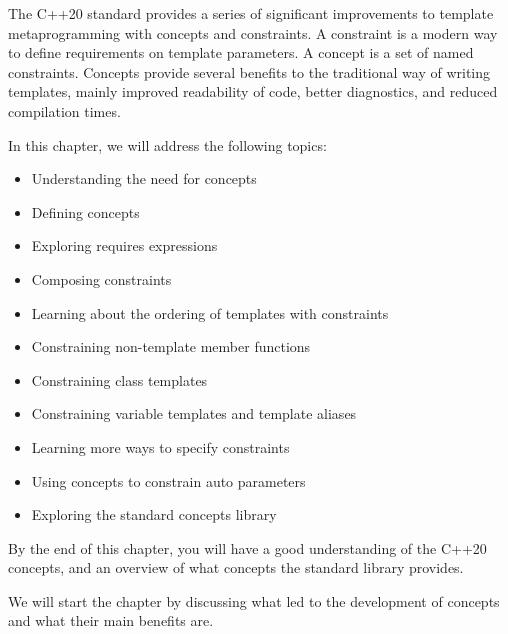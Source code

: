 The C++20 standard provides a series of significant improvements to template metaprogramming with concepts and constraints. A constraint is a modern way to define requirements on template parameters. A concept is a set of named constraints. Concepts provide several benefits to the traditional way of writing templates, mainly improved readability of code, better diagnostics, and reduced compilation times.

In this chapter, we will address the following topics:

\begin{itemize}
\item
Understanding the need for concepts

\item
Defining concepts

\item
Exploring requires expressions

\item
Composing constraints

\item
Learning about the ordering of templates with constraints

\item
Constraining non-template member functions

\item
Constraining class templates

\item
Constraining variable templates and template aliases

\item
Learning more ways to specify constraints

\item
Using concepts to constrain auto parameters

\item
Exploring the standard concepts library
\end{itemize}

By the end of this chapter, you will have a good understanding of the C++20 concepts, and an overview of what concepts the standard library provides.

We will start the chapter by discussing what led to the development of concepts and what their main benefits are.


























